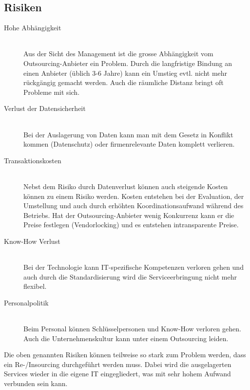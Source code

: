 \subsection{Risiken}
\begin{description}
	\item[Hohe Abhängigkeit] \hfill \\
	Aus der Sicht des Management ist die grosse Abhängigkeit vom Outsourcing-Anbieter ein Problem. Durch die langfristige Bindung an einen Anbieter (üblich 3-6 Jahre) kann ein Umstieg evtl. nicht mehr rückgängig gemacht werden. Auch die räumliche Distanz bringt oft Probleme mit sich. 
	\item[Verlust der Datensicherheit] \hfill \\
	Bei der Auslagerung von Daten kann man mit dem Gesetz in Konflikt kommen (Datenschutz) oder firmenrelevante Daten komplett verlieren.
	\item[Transaktionskosten] \hfill \\
	Nebst dem Risiko durch Datenverlust können auch steigende Kosten können zu einem Risiko werden. Kosten entstehen bei der Evaluation, der Umstellung und auch durch erhöhten Koordinationsaufwand während des Betriebs. Hat der Outsourcing-Anbieter wenig Konkurrenz kann er die Preise festlegen (Vendorlocking) und es entstehen intransparente Preise.
	\item[Know-How Verlust] \hfill \\
	Bei der Technologie kann IT-spezifische Kompetenzen verloren gehen und auch durch die Standardisierung wird die Serviceerbringung nicht mehr flexibel.
	\item[Personalpolitik] \hfill \\
	Beim Personal können Schlüsselpersonen und Know-How verloren gehen. Auch die Unternehmenskultur kann unter einem Outsourcing leiden.
\end{description}
Die oben genannten Risiken können teilweise so stark zum Problem werden, dass ein Re-/Insourcing durchgeführt werden muss. Dabei wird die ausgelagerten Services wieder in die eigene IT eingegliedert, was mit sehr hohem Aufwand verbunden sein kann.
